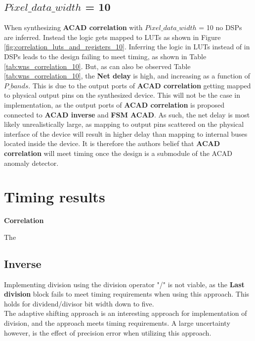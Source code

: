 \subsection{$Pixel\_data\_width$ = 10}
When synthesizing \textbf{ACAD correlation} with $Pixel\_data\_width$ = 10 no DSPs are inferred. Instead the logic gets mapped to LUTs as shown in Figure \ref{fig:correlation_luts_and_registers_10}. Inferring the logic in LUTs instead of in DSPs leads to the design failing to meet timing, as shown in Table \ref{tab:wns_correlation_10}. But, as can also be observed Table \ref{tab:wns_correlation_10}, the \textbf{Net delay} is high, and increasing as a function of $P\_bands$. This is due to the output ports of \textbf{ACAD correlation} getting mapped to physical output pins on the synthesized device. This will not be the case in implementation, as the output ports of \textbf{ACAD correlation} is proposed connected to \textbf{ACAD inverse} and \textbf{FSM ACAD}. 
As such, the net delay is most likely unrealistically large, as mapping to output pins scattered on the physical interface of the device will result in higher delay than mapping to internal buses located inside the device. It is therefore the authors belief that \textbf{ACAD correlation} will meet timing once the design is a submodule of the ACAD anomaly detector.  



\section{Timing results}
\textbf{Correlation}

The 

\subsection{\textbf{Inverse}}
 Implementing division using the division operator "/" is not viable, as the \textbf{Last division} block fails to meet timing requirements when using this approach. This holds for dividend/divisor bit width down to five. \\

The adaptive shifting approach is an interesting approach for implementation of division, and the approach meets timing requirements. A large uncertainty however, is the effect of precision error when utilizing this approach.\\ 

